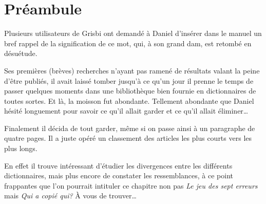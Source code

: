 

\chapter{Préambule\label{preamble}}


Plusieurs utilisateurs de \gls{Grisbi} ont demandé à Daniel  d'insérer dans le manuel un bref rappel de la signification de ce mot, qui, à son grand dam, est retombé en désuétude.

Ses premières (brèves) recherches n'ayant pas ramené de résultats valant la peine d'être publiés, il avait laissé tomber jusqu'à ce qu'un jour il prenne le temps de passer quelques moments dans une bibliothèque bien fournie en dictionnaires de toutes sortes. Et là, la moisson fut abondante. Tellement abondante que Daniel  hésité longuement pour savoir ce qu'il allait garder et ce qu'il allait éliminer\ldots

Finalement il décida de tout garder, même si on passe ainsi à un paragraphe de quatre pages. Il a juste opéré un classement des articles les plus courts vers les plus longs.

En effet il trouve intéressant d'étudier les divergences entre les différents dictionnaires, mais plus encore de constater les ressemblances, à ce point frappantes que l'on pourrait intituler ce chapitre non pas \emph{Le jeu des sept erreurs} mais \emph{Qui a copié qui?} À vous de trouver\dots

